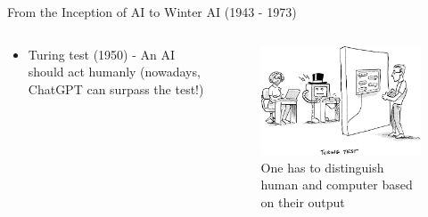 \begin{frame}{From the Inception of AI to Winter AI (1943 - 1973)}
    \begin{columns}
        \begin{column}{0.5\textwidth}
            \begin{itemize}
                \item Turing test (1950) - An AI should act humanly (nowadays, ChatGPT can surpass the test!)
            \end{itemize}
        \end{column}

        \begin{column}{0.5\textwidth}
            \begin{figure}
                \centering
                \includegraphics[width=\linewidth]{img/turing_test.png}
                \caption{One has to distinguish human and computer based on their output}
            \end{figure}
        \end{column}
    \end{columns}
\end{frame}

